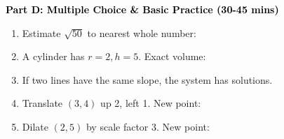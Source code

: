 \documentclass[12pt, letterpaper, fleqn]{article}
\newcommand{\blank}{\underline{\hspace{2.2cm}}}
\begin{document}
\newpage

\begin{tcolorbox}[colback=customteal!20]
\large\textcolor{black}{\textbf{Part D: Multiple Choice \& Basic Practice (30-45 mins)}}
\end{tcolorbox}

\vspace{3mm}

\begin{enumerate}[itemsep=2.5cm, leftmargin=0.6cm, resume]
\item Estimate $\sqrt{50}$ to nearest whole number: \blank
\item A cylinder has $r=2, h=5$. Exact volume: \blank
\item If two lines have the same slope, the system has \blank solutions.
\item Translate $(3,4)$ up 2, left 1. New point: \blank
\item Dilate $(2, 5)$ by scale factor 3. New point: \blank
\end{enumerate}
\end{document}
